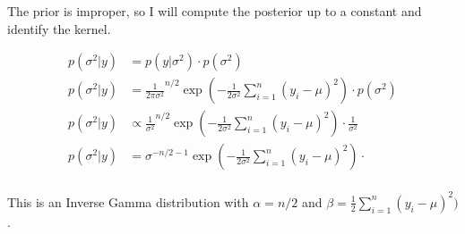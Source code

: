 
The prior is improper, so I will compute the posterior up to a constant and identify the kernel.

\begin{align*}
    p(\sigma^2|y) &= p(y|\sigma^2)\cdot p(\sigma^2)\\
    p(\sigma^2|y) &= \frac{1}{2\pi\sigma^2}^{n/2}  \exp(-\frac{1}{2\sigma^2}\sum_{i=1}^n(y_i-\mu)^2)\cdot p(\sigma^2)\\
    p(\sigma^2|y) &\propto \frac{1}{\sigma^2}^{n/2}  \exp(-\frac{1}{2\sigma^2}\sum_{i=1}^n(y_i-\mu)^2)\cdot \frac{1}{\sigma^2}\\
    p(\sigma^2|y) &= \sigma^{-n/2-1}  \exp(-\frac{1}{2\sigma^2}\sum_{i=1}^n(y_i-\mu)^2)\cdot \\
\end{align*}

This is an Inverse Gamma distribution with $\alpha = n/2$ and $\beta = \frac{1}{2}\sum_{i=1}^n(y_i-\mu)^2)$.
